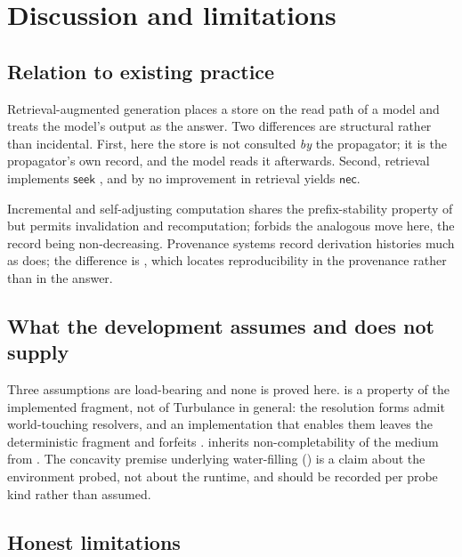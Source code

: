 \documentclass[twocolumn,11pt,a4paper]{article}
\theoremstyle{sup}
\theoremstyle{definition}
\theoremstyle{remark}
\newcommand{\seek}{\mathsf{seek}}
\newcommand{\nec}{\mathsf{nec}}
\begin{document}
\section{Discussion and limitations}
\label{sec:limits}

\subsection{Relation to existing practice}

Retrieval-augmented generation places a store on the read path of a model and
treats the model's output as the answer. Two differences are structural rather
than incidental. First, here the store is not consulted \emph{by} the
propagator; it is the propagator's own record, and the model reads it
afterwards. Second, retrieval implements $\seek$
\citep[\S13.5]{sachikonye2025directional}, and by  no
improvement in retrieval yields $\nec$.

Incremental and self-adjusting computation \citep{acar2006} shares the
prefix-stability property of  but permits invalidation
and recomputation;  forbids the analogous move here, the
record being non-decreasing. Provenance systems \citep{cheney2009} record
derivation histories much as  does; the difference is
, which locates reproducibility in the provenance rather than
in the answer.

\subsection{What the development assumes and does not supply}

Three assumptions are load-bearing and none is proved here.  is a
property of the implemented fragment, not of Turbulance in general: the
resolution forms admit world-touching resolvers, and an implementation that
enables them leaves the deterministic fragment and forfeits
.  inherits non-completability
of the medium from \citet{sachikonye2025residue}. The concavity premise
underlying water-filling () is a claim about the environment
probed, not about the runtime, and should be recorded per probe kind rather
than assumed.

\subsection{Honest limitations}
\end{document}
